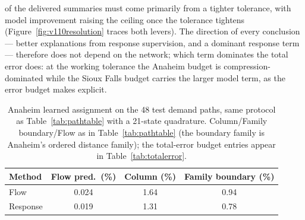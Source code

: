 of the delivered summaries must come primarily from a tighter
tolerance, with model improvement raising the ceiling once the
tolerance tightens (Figure~\ref{fig:v110resolution} traces both
levers). The direction of every
conclusion --- better explanations from response supervision, and a
dominant response term --- therefore does not depend on the network;
which term dominates the total error does: at the working tolerance
the Anaheim budget is compression-dominated while the Sioux Falls
budget carries the larger model term, as the error budget makes
explicit.
\begin{table}[t]\centering\footnotesize
\caption{Anaheim learned assignment on the 48 test demand paths, same
protocol as Table~\ref{tab:pathtable} with a 21-state quadrature.
Column/Family boundary/Flow as in Table~\ref{tab:pathtable} (the
boundary family is Anaheim's ordered distance family); the
total-error budget entries appear in Table~\ref{tab:totalerror}.}
\label{tab:anaheimlearning}
\setlength{\tabcolsep}{5pt}
\begin{tabular*}{\tblwidth}{@{\extracolsep{\fill}}lccc}
\toprule
Method & Flow pred.\ (\%) & Column (\%) & Family boundary (\%)\\
\midrule
Flow & 0.024 & 1.64 & 0.94\\
Response & 0.019 & 1.31 & 0.78\\
\bottomrule\end{tabular*}\end{table}
